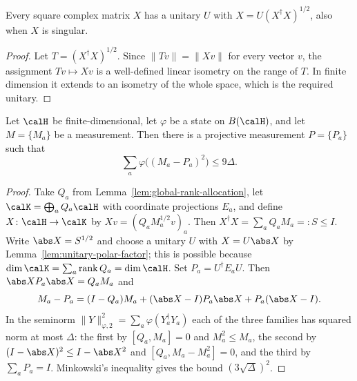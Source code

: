 \begin{lemma}\label{lem:unitary-polar-factor}
	\leanok
	Every square complex matrix $X$ has a unitary $U$ with
	$X=U(X^\dagger X)^{1/2}$, also when $X$ is singular.
\end{lemma}
\begin{proof}
	\leanok
	Let $T=(X^\dagger X)^{1/2}$.  Since $\|Tv\|=\|Xv\|$ for every vector $v$,
	the assignment $Tv\mapsto Xv$ is a well-defined linear isometry on the
	range of $T$.  In finite dimension it extends to an isometry of the whole
	space, which is the required unitary.
\end{proof}

\begin{lemma}\label{lem:state-dependent-orthogonalization}
	\leanok
	Let $\calH$ be finite-dimensional, let $\varphi$ be a state on $B(\calH)$,
	and let $M=\{M_a\}$ be a measurement.  Then there is a projective
	measurement $P=\{P_a\}$ such that
	\[
		\sum_a\varphi\bigl((M_a-P_a)^2\bigr)\le9\Delta.
	\]
\end{lemma}
\begin{proof}
	\leanok
	Take $Q_a$ from Lemma~\ref{lem:global-rank-allocation}, let
	$\calK=\bigoplus_aQ_a\calH$ with coordinate projections $E_a$, and define
	$X\colon\calH\to\calK$ by $Xv=(Q_aM_a^{1/2}v)_a$.  Then
	$X^\dagger X=\sum_aQ_aM_a=:S\le I$.  Write $\abs X=S^{1/2}$ and choose a
	unitary $U$ with $X=U\abs X$ by Lemma~\ref{lem:unitary-polar-factor}; this
	is possible because $\dim\calK=\sum_a\operatorname{rank}Q_a=\dim\calH$.  Set
	$P_a=U^\dagger E_aU$.  Then $\abs XP_a\abs X=Q_aM_a$ and
	\[
		M_a-P_a=(I-Q_a)M_a+(\abs X-I)P_a\abs X+P_a(\abs X-I).
	\]
	In the seminorm $\|Y\|_{\varphi,2}^2=\sum_a\varphi(Y_a^\dagger Y_a)$ each of
	the three families has squared norm at most $\Delta$: the first by
	$[Q_a,M_a]=0$ and $M_a^2\le M_a$, the second by
	$(I-\abs X)^2\le I-\abs X^2$ and $[Q_a,M_a-M_a^2]=0$, and the third by
	$\sum_aP_a=I$.  Minkowski's inequality gives the bound $(3\sqrt\Delta)^2$.
\end{proof}

